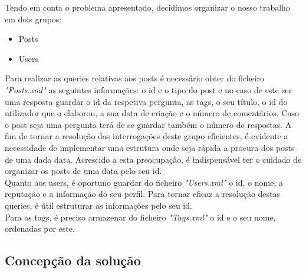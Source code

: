 \documentclass[10pt,a4paper]{article}
\begin{document}
Tendo em conta o problema apresentado, decidimos organizar o nosso trabalho em dois grupos:

\begin{itemize}
 \item Posts
 \item Users
\end{itemize}

Para realizar as queries relativas aos posts é necessário obter do ficheiro \textit{"Posts.xml"} as seguintes informações: o id e o tipo do post e no caso de este ser uma resposta guardar o id da respetiva pergunta, as tags, o seu título, o id do utilizador que o elaborou, a sua data de criação e o número de comentários. Caso o post seja uma pergunta terá de se guardar também o número de respostas. A fim de tornar a resolução das interrogações deste grupo eficientes, é evidente a necessidade de implementar uma estrutura onde seja rápida a procura dos posts de uma dada data. Acrescido a esta preocupação, é indispensável ter o cuidado de organizar os posts de uma data pelo seu id.\\
 \indent  Quanto aos users, é oportuno guardar do ficheiro \textit{"Users.xml"} o id, o nome, a reputação e a informação do seu perfil. Para tornar eficaz a resolução destas queries, é útil estruturar as informações pelo seu id.\\
 \indent Para as tags, é preciso armazenar do ficheiro \textit{"Tags.xml"} o id e o seu nome, ordenadas por este.

\subsection{Concepção da solução}
\end{document}
